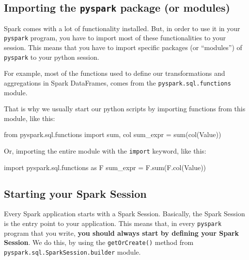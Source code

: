 \documentclass[
  11pt,
  letterpaper,
  DIV=11,
  numbers=noendperiod]{scrreprt}
\newenvironment{Shaded}{\begin{snugshade}}{\end{snugshade}}
\newcommand{\BuiltInTok}[1]{\textcolor[rgb]{0.00,0.23,0.31}{#1}}
\newcommand{\ImportTok}[1]{\textcolor[rgb]{0.00,0.46,0.62}{#1}}
\newcommand{\NormalTok}[1]{\textcolor[rgb]{0.00,0.23,0.31}{#1}}
\newcommand{\OperatorTok}[1]{\textcolor[rgb]{0.37,0.37,0.37}{#1}}
\newcommand{\StringTok}[1]{\textcolor[rgb]{0.13,0.47,0.30}{#1}}
\begin{document}
\hypertarget{importing-the-pyspark-package-or-modules}{%
\subsection{\texorpdfstring{Importing the \texttt{pyspark} package (or
modules)}{Importing the pyspark package (or modules)}}\label{importing-the-pyspark-package-or-modules}}

Spark comes with a lot of functionality installed. But, in order to use
it in your \texttt{pyspark} program, you have to import most of these
functionalities to your session. This means that you have to import
specific packages (or ``modules'') of \texttt{pyspark} to your python
session.

For example, most of the functions used to define our transformations
and aggregations in Spark DataFrames, comes from the
\texttt{pyspark.sql.functions} module.

That is why we usually start our python scripts by importing functions
from this module, like this:

\begin{Shaded}
\begin{Highlighting}[]
\ImportTok{from}\NormalTok{ pyspark.sql.functions }\ImportTok{import} \BuiltInTok{sum}\NormalTok{, col}
\NormalTok{sum\_expr }\OperatorTok{=} \BuiltInTok{sum}\NormalTok{(col(}\StringTok{\textquotesingle{}Value\textquotesingle{}}\NormalTok{))}
\end{Highlighting}
\end{Shaded}

Or, importing the entire module with the \texttt{import} keyword, like
this:

\begin{Shaded}
\begin{Highlighting}[]
\ImportTok{import}\NormalTok{ pyspark.sql.functions }\ImportTok{as}\NormalTok{ F}
\NormalTok{sum\_expr }\OperatorTok{=}\NormalTok{ F.}\BuiltInTok{sum}\NormalTok{(F.col(}\StringTok{\textquotesingle{}Value\textquotesingle{}}\NormalTok{))}
\end{Highlighting}
\end{Shaded}

\hypertarget{starting-your-spark-session}{%
\subsection{Starting your Spark
Session}\label{starting-your-spark-session}}

Every Spark application starts with a Spark Session. Basically, the
Spark Session is the entry point to your application. This means that,
in every \texttt{pyspark} program that you write, \textbf{you should
always start by defining your Spark Session}. We do this, by using the
\texttt{getOrCreate()} method from
\texttt{pyspark.sql.SparkSession.builder} module.
\end{document}
